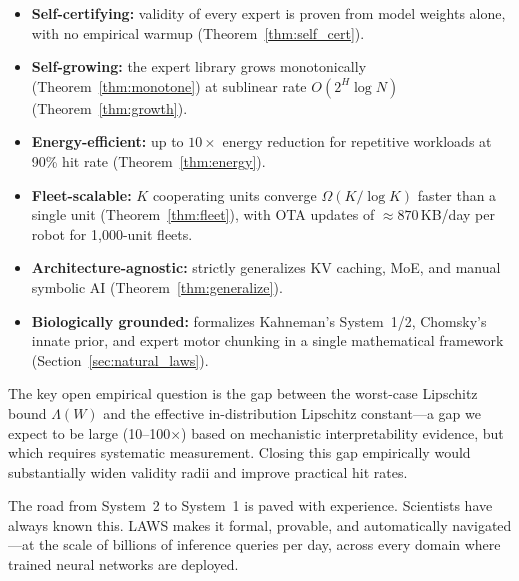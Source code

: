 \documentclass[11pt]{article}
\begin{document}
\begin{itemize}[leftmargin=2em]
  \item \textbf{Self-certifying:} validity of every expert is proven from
        model weights alone, with no empirical warmup (Theorem~\ref{thm:self_cert}).
  \item \textbf{Self-growing:} the expert library grows monotonically
        (Theorem~\ref{thm:monotone}) at sublinear rate $O(2^H \log N)$
        (Theorem~\ref{thm:growth}).
  \item \textbf{Energy-efficient:} up to $10\times$ energy reduction for
        repetitive workloads at 90\% hit rate (Theorem~\ref{thm:energy}).
  \item \textbf{Fleet-scalable:} $K$ cooperating units converge
        $\Omega(K/\log K)$ faster than a single unit (Theorem~\ref{thm:fleet}),
        with OTA updates of $\approx 870$\,KB/day per robot for 1,000-unit fleets.
  \item \textbf{Architecture-agnostic:} strictly generalizes KV caching, MoE,
        and manual symbolic AI (Theorem~\ref{thm:generalize}).
  \item \textbf{Biologically grounded:} formalizes Kahneman's System~1/2,
        Chomsky's innate prior, and expert motor chunking in a single
        mathematical framework (Section~\ref{sec:natural_laws}).
\end{itemize}

The key open empirical question is the gap between the worst-case Lipschitz
bound $\Lambda(W)$ and the effective in-distribution Lipschitz constant---a gap
we expect to be large (10--100$\times$) based on mechanistic interpretability
evidence, but which requires systematic measurement.  Closing this gap
empirically would substantially widen validity radii and improve practical
hit rates.

The road from System~2 to System~1 is paved with experience.  Scientists
have always known this.  LAWS makes it formal, provable, and automatically
navigated---at the scale of billions of inference queries per day, across
every domain where trained neural networks are deployed.



\end{document}
